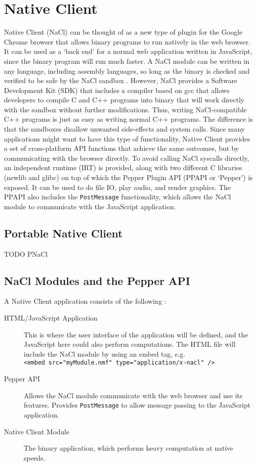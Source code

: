 \section{Native Client} %
\label{sec:native_client_intro}

Native Client (NaCl) can be thought of as a new type of plugin for the Google Chrome browser that allows binary programs to run natively in the web browser. It can be used as a `back end' for a normal web application written in JavaScript, since the binary program will run much faster. A NaCl module can be written in any language, including assembly languages, so long as the binary is checked and verified to be safe by the NaCl sandbox \cite{nacl}. However, NaCl provides a Software Development Kit (SDK) that includes a compiler based on gcc that allows developers to compile C and C++ programs into binary that will work directly with the sandbox without further modifications. Thus, writing NaCl-compatible C++ programs is just as easy as writing normal C++ programs. The difference is that the sandboxes disallow unwanted side-effects and system calls. Since many applications might want to have this type of functionality, Native Client provides a set of cross-platform API functions that achieve the same outcomes, but by communicating with the browser directly. To avoid calling NaCl syscalls directly, an independent runtime (IRT) is provided, along with two different C libraries (newlib and glibc) on top of which the Pepper Plugin API (PPAPI or `Pepper') is exposed. It can be used to do file IO, play audio, and render graphics. The PPAPI also includes the \lstinline+PostMessage+ functionality, which allows the NaCl module to communicate with the JavaScript application.

\subsection{Portable Native Client} %
\label{sub:portable_native_client}
TODO PNaCl

\subsection{NaCl Modules and the Pepper API} %
\label{sub:nacl_modules_ppapi}
A Native Client application consists of the following \cite{nacloverview}:
\begin{description}
  \item[HTML/JavaScript Application] 
  This is where the user interface of the application will be defined, and the JavaScript here could also perform computations. The HTML file will include   the NaCl module by using an embed tag, e.g. \\
   \lstinline+<embed src="myModule.nmf" type="application/x-nacl" />+
  \item[Pepper API] 
  Allows the NaCl module communicate with the web browser and use its features. Provides \lstinline+PostMessage+ to allow message passing to the JavaScript application.
  \item[Native Client Module] 
  The binary application, which performs heavy computation at native speeds.
\end{description}

